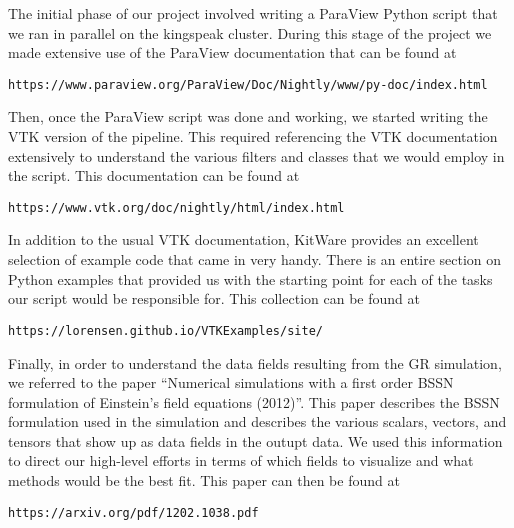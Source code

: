 The initial phase of our project involved writing a ParaView Python script that we ran in parallel on the kingspeak cluster. During this stage of the project we made extensive use of the ParaView documentation that can be found at

\begin{lstlisting}[basicstyle=\small]
https://www.paraview.org/ParaView/Doc/Nightly/www/py-doc/index.html
\end{lstlisting}

Then, once the ParaView script was done and working, we started writing the VTK version of the pipeline. This required referencing the VTK documentation extensively to understand the various filters and classes that we would employ in the script. This documentation can be found at

\begin{lstlisting}[basicstyle=\small]
https://www.vtk.org/doc/nightly/html/index.html
\end{lstlisting}

In addition to the usual VTK documentation, KitWare provides an excellent selection of example code that came in very handy. There is an entire section on Python examples that provided us with the starting point for each of the tasks our script would be responsible for. This collection can be found at

\begin{lstlisting}[basicstyle=\small]
https://lorensen.github.io/VTKExamples/site/
\end{lstlisting}

Finally, in order to understand the data fields resulting from the GR simulation, we referred to the paper “Numerical simulations with a first order BSSN formulation of Einstein’s field equations (2012)”. This paper describes the BSSN formulation used in the simulation and describes the various scalars, vectors, and tensors that show up as data fields in the outupt data. We used this information to direct our high-level efforts in terms of which fields to visualize and what methods would be the best fit. This paper can then be found at

\begin{lstlisting}[basicstyle=\small]
https://arxiv.org/pdf/1202.1038.pdf
\end{lstlisting}